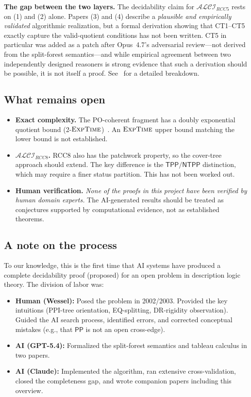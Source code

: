 \documentclass[
]{ceurart}
\theoremstyle{definition}
\newcommand{\ALCIRCC}[1]{\ensuremath{\mathcal{ALCI}_{\mathit{RCC#1}}}}
\newcommand{\PP}{\ensuremath{\mathsf{PP}}}
\newcommand{\TPP}{\ensuremath{\mathsf{TPP}}}
\newcommand{\NTPP}{\ensuremath{\mathsf{NTPP}}}
\newcommand{\EXPTIME}{\textsc{ExpTime}}
\begin{document}
\medskip\noindent\textbf{The gap between the two layers.}
The decidability claim for $\ALCIRCC{5}$ rests on (1) and (2)
alone.  Papers (3) and (4) describe a \emph{plausible and
empirically validated} algorithmic realization, but a formal
derivation showing that CT1--CT5 exactly capture the
valid-quotient conditions has not been written.  CT5 in particular
was added as a patch after Opus~4.7's adversarial review---not
derived from the split-forest semantics---and while empirical
agreement between two independently designed reasoners is strong
evidence that such a derivation should be possible, it is not
itself a proof.  See~\cite[\S7]{CoverTreeImpl} for a detailed
breakdown.

\subsection{What remains open}

\begin{itemize}
  \item \textbf{Exact complexity.}  The PO-coherent fragment has a
    doubly exponential quotient bound
    (2-$\EXPTIME$)~\cite{TwoTierQuotient}.  An $\EXPTIME$ upper
    bound matching the lower bound is not established.

  \item \textbf{$\ALCIRCC{8}$.}  RCC8 also has the patchwork
    property, so the cover-tree approach should extend.  The key
    difference is the $\TPP/\NTPP$ distinction, which may require
    a finer status partition.  This has not been worked out.

  \item \textbf{Human verification.}  \emph{None of the proofs in
    this project have been verified by human domain experts.}  The
    AI-generated results should be treated as conjectures supported
    by computational evidence, not as established theorems.
\end{itemize}

\subsection{A note on the process}

To our knowledge, this is the first time that AI systems have
produced a complete decidability proof (proposed) for an open
problem in description logic theory.  The division of labor was:
\begin{itemize}
  \item \textbf{Human (Wessel):} Posed the problem in 2002/2003.
    Provided the key intuitions (PPI-tree orientation, EQ-splitting,
    DR-rigidity observation).  Guided the AI search process,
    identified errors, and corrected conceptual mistakes
    (e.g., that $\PP$ is not an open cross-edge).
  \item \textbf{AI (GPT-5.4):} Formalized the split-forest semantics
    and tableau calculus in two papers.
  \item \textbf{AI (Claude):} Implemented the algorithm, ran
    extensive cross-validation, closed the completeness gap, and
    wrote companion papers including this overview.
\end{itemize}
\end{document}
